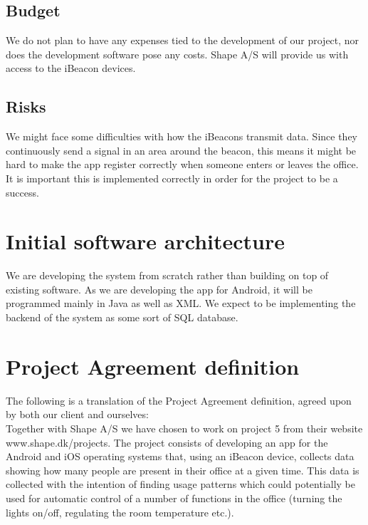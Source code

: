 \documentclass[12pt]{article}
\begin{document}
\newpage
\subsection{Budget}
We do not plan to have any expenses tied to the development of our project, nor does the development software pose any costs. Shape A/S will provide us with access to the iBeacon devices.\\


\subsection{Risks}
We might face some difficulties with how the iBeacons transmit data. Since they continuously send a signal in an area around the beacon, this means it might be hard to make the app register correctly when someone enters or leaves the office. It is important this is implemented correctly in order for the project to be a success.\\










\section{Initial software architecture}

We are developing the system from scratch rather than building on top of existing software. As we are developing the app for Android, it will be programmed mainly in Java as well as XML. We expect to be implementing the backend of the system as some sort of SQL database.\\










\newpage
\section{Project Agreement definition}

The following is a translation of the Project Agreement definition, agreed upon by both our client and ourselves:\\

Together with Shape A/S we have chosen to work on project 5 from their website www.shape.dk/projects. The project consists of developing an app for the Android and iOS operating systems that, using an iBeacon device, collects data showing how many people are present in their office at a given time. This data is collected with the intention of finding usage patterns which could potentially be used for automatic control of a number of functions in the office (turning the lights on/off, regulating the room temperature etc.).\\
\end{document}
